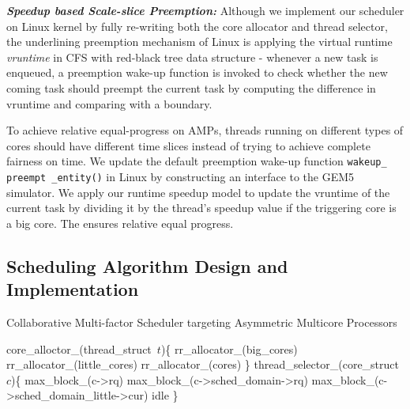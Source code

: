 \documentclass{sig-alternate}
\begin{document}
\textbf{\textit {Speedup based Scale-slice Preemption:}} Although we implement our scheduler on Linux kernel by fully re-writing both the core allocator and thread selector, the underlining preemption mechanism of Linux is applying the virtual runtime {\it vruntime} in CFS with red-black tree data structure - whenever a new task is enqueued, a preemption wake-up function is invoked to check whether the new coming task should preempt the current task by computing the difference in vruntime and comparing with a boundary. 

To achieve relative equal-progress on AMPs, threads running on different types of cores should have different time slices instead of trying to achieve complete fairness on time. We update the default preemption wake-up function \texttt{wakeup\_ preempt \_entity()} in Linux by constructing an interface to the GEM5 simulator. We apply our runtime speedup model to update the vruntime of the current task by dividing it by the thread's speedup value if the triggering core is a big core. The ensures relative equal progress.




\subsection{Scheduling Algorithm Design and Implementation}
\begin{algorithm}
\caption{Collaborative Multi-factor Scheduler targeting Asymmetric Multicore Processors}
\label{alg:1}
\begin{algorithmic}[1]
\STATE core\_alloctor\_(thread\_struct\ $t$)\{
\RETURN rr\_allocator\_(big\_cores)
\ENDIF
{}
\RETURN rr\_allocator\_(little\_cores)
\ENDIF
\RETURN rr\_allocator\_(cores)
\STATE \}
\STATE thread\_selector\_(core\_struct\ $c$)\{
\RETURN max\_block\_(c->rq)
\ENDIF
\RETURN max\_block\_(c->sched\_domain->rq)
\ENDIF
{}
\RETURN  max\_block\_(c->sched\_domain\_little->cur)
\ENDIF
\RETURN idle
\STATE \}
\end{algorithmic}
\end{algorithm}
\end{document}

